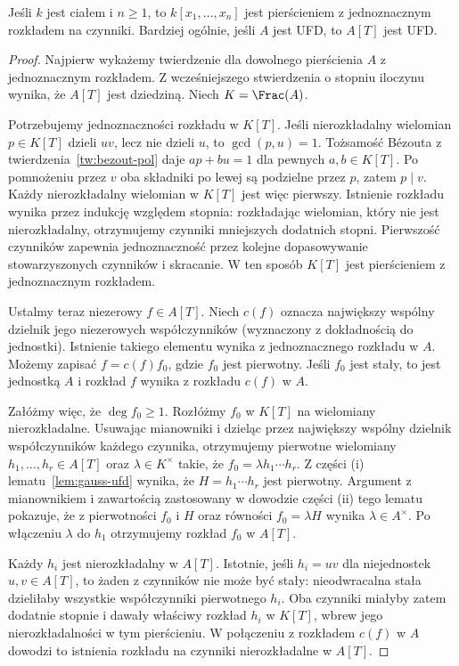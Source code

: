 \begin{twierdzenie}
\label{tw:polynomial-UFD}
Jeśli $k$ jest ciałem i $n\ge1$, to
$k[x_1,\dots,x_n]$ jest pierścieniem z jednoznacznym
rozkładem na czynniki. Bardziej ogólnie, jeśli $A$
jest UFD, to $A[T]$ jest UFD.
\end{twierdzenie}
\begin{proof}
Najpierw wykażemy twierdzenie dla dowolnego pierścienia $A$
z jednoznacznym rozkładem. Z wcześniejszego stwierdzenia
o stopniu iloczynu wynika, że $A[T]$ jest dziedziną.
Niech $K=\Frac(A)$.

Potrzebujemy jednoznaczności rozkładu w $K[T]$.
Jeśli nierozkładalny wielomian $p\in K[T]$ dzieli $uv$,
lecz nie dzieli $u$, to $\gcd(p,u)=1$.
Tożsamość Bézouta z twierdzenia~\ref{tw:bezout-pol}
daje $ap+bu=1$ dla pewnych $a,b\in K[T]$.
Po pomnożeniu przez $v$ oba składniki po lewej są
podzielne przez $p$, zatem $p\mid v$.
Każdy nierozkładalny wielomian w $K[T]$ jest więc pierwszy.
Istnienie rozkładu wynika przez indukcję względem stopnia:
rozkładając wielomian, który nie jest nierozkładalny,
otrzymujemy czynniki mniejszych dodatnich stopni.
Pierwszość czynników zapewnia jednoznaczność przez
kolejne dopasowywanie stowarzyszonych czynników i skracanie.
W ten sposób $K[T]$ jest pierścieniem z jednoznacznym rozkładem.

Ustalmy teraz niezerowy $f\in A[T]$. Niech $c(f)$ oznacza
największy wspólny dzielnik jego niezerowych współczynników
(wyznaczony z dokładnością do jednostki). Istnienie takiego
elementu wynika z jednoznacznego rozkładu w $A$.
Możemy zapisać $f=c(f)f_0$, gdzie $f_0$ jest pierwotny.
Jeśli $f_0$ jest stały, to jest jednostką $A$ i
rozkład $f$ wynika z rozkładu $c(f)$ w $A$.

Załóżmy więc, że $\deg f_0\ge1$. Rozłóżmy $f_0$
w $K[T]$ na wielomiany nierozkładalne.
Usuwając mianowniki i dzieląc przez największy wspólny
dzielnik współczynników każdego czynnika, otrzymujemy
pierwotne wielomiany $h_1,\dots,h_r\in A[T]$ oraz
$\lambda\in K^\times$ takie, że
$f_0=\lambda h_1\cdots h_r$.
Z części (i) lematu~\ref{lem:gauss-ufd} wynika, że
$H=h_1\cdots h_r$ jest pierwotny.
Argument z mianownikiem i zawartością zastosowany
w dowodzie części (ii) tego lematu pokazuje, że z
pierwotności $f_0$ i $H$ oraz równości $f_0=\lambda H$
wynika $\lambda\in A^\times$.
Po włączeniu $\lambda$ do $h_1$ otrzymujemy rozkład
$f_0$ w $A[T]$.

Każdy $h_i$ jest nierozkładalny w $A[T]$.
Istotnie, jeśli $h_i=uv$ dla niejednostek $u,v\in A[T]$,
to żaden z czynników nie może być stały: nieodwracalna
stała dzieliłaby wszystkie współczynniki pierwotnego $h_i$.
Oba czynniki miałyby zatem dodatnie stopnie i dawały
właściwy rozkład $h_i$ w $K[T]$, wbrew jego
nierozkładalności w tym pierścieniu. W połączeniu z
rozkładem $c(f)$ w $A$ dowodzi to istnienia rozkładu
na czynniki nierozkładalne w $A[T]$.


\end{proof}
